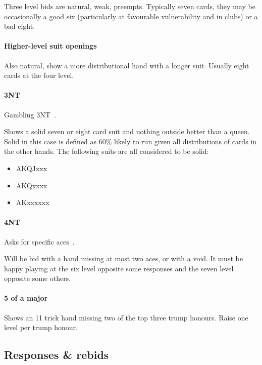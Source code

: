 \documentclass[a4paper,14pt]{extarticle}
\begin{document}
Three level bids are natural, weak, preempts. Typically seven cards, they may
be occasionally a good six (particularly at favourable vulnerability and in clubs) or a bad eight.

\paragraph{Higher-level suit openings}

Also natural, show a more distributional hand with a longer suit. Usually eight
cards at the four level.

\paragraph{3NT}

Gambling 3NT~. 

Shows a solid seven or eight card suit and nothing outside better than a queen.
Solid in this case is defined as 60\% likely to run given all distributions of
cards in the other hands. The following suits are all considered to be solid:

\begin{itemize}
\item AKQJxxx
\item AKQxxxx
\item AKxxxxxx
\end{itemize}

\paragraph{4NT}

Asks for specific aces~.

Will be bid with a hand missing at most two aces, or with a void. It must be happy playing at the six level opposite some responses and the seven level opposite some others.

\paragraph{5 of a major}

Shows an 11 trick hand missing two of the top three trump honours. Raise one level per trump honour.

\newpage

\subsection{Responses \& rebids}
\label{sec:responses}
\end{document}
